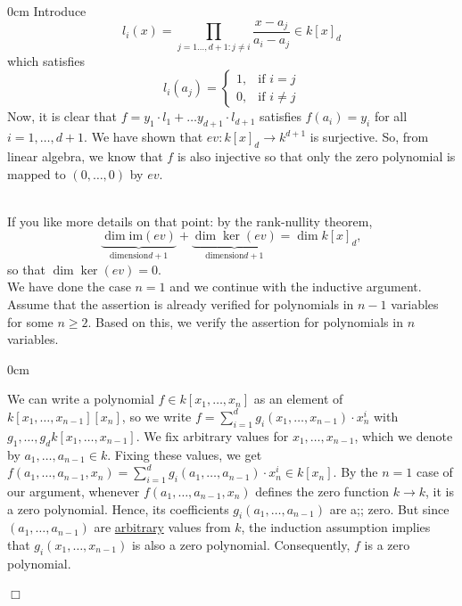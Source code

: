 \begin{theorem}[title =Theorem 1.1.8 (Continued)]
\begin{addmargin}[0.6cm]{0cm}
  Introduce \[l_i(x) = \prod_{j = 1 \ldots, d+ 1: j \neq i} \frac{x - a_j}{a_i - a_j} \in k[x]_{d}\] which satisfies 
  \[l_i(a_j) = \begin{cases}
    1, & \text{if } i = j \\ 
    0, & \text{if } i \neq j
  \end{cases}\]
  Now, it is clear that $f = y_1 \cdot l_1 + \ldots y_{d+1} \cdot l_{d+1}$ satisfies $f(a_i) = y_i$ for all $i = 1, \ldots, d+1$. 
  We have shown that $ev: k[x]_d \to k^{d+1}$ is surjective. So, from linear algebra, we know that $f$ is also injective so that only the zero polynomial 
  is mapped to $(0, \ldots, 0)$ by $ev$. 
\end{addmargin} \ \\
If you like more details on that point:  by the rank-nullity theorem, \[\underbrace{\dim \text{im}(ev)}_{\text{dimension} d+1}  + \underbrace{\dim \ker(ev)}_{\text{dimension} d+1} = \dim k[x]_d,\] so that $\dim \ker(ev) = 0$. \\

  We have done the case $n =1$ and we continue with the inductive argument. Assume that the assertion is already verified for polynomials in $n -1$ variables for some $n \geq 2$. 
  Based on this, we verify the assertion for polynomials in $n$ variables. \\
    \begin{addmargin}[0.6cm]{0cm}  

  We can write a polynomial $f \in k[x_1, \dots, x_n]$ as an element of $k[x_1, \dots, x_{n-1}][x_n]$, so we write $f= \sum_{i = 1}^{d} g_i(x_1, \dots, x_{n-1}) \cdot x_n^i$ with $g_1, \ldots, g_d  k[x_1, \dots, x_{n-1}]$. 
  We fix arbitrary values for $x_1, \ldots, x_{n-1}$, which we denote by $a_1, \ldots, a_{n-1} \in k$. Fixing these values, we get $f(a_1, \ldots, a_{n-1}, x_n) = \sum_{i=1}^{d}g_i(a_1, \ldots, a_{n-1}) \cdot x_n^i \in k[x_n]$. 
  By the $n=1$ case of our argument, whenever $f(a_1, \ldots, a_{n-1}, x_n)$ defines the zero function $k \to k$, it is a zero polynomial. 
  Hence, its coefficients $g_i(a_1, \ldots, a_{n-1})$ are a;; zero. But since $(a_1, \ldots, a_{n-1})$ are \underline{arbitrary} values from $k$, the induction assumption implies that $g_i(x_1, \ldots, x_{n-1})$
  is also a zero polynomial. Consequently, $f$ is a zero polynomial.   
    \end{addmargin}
  \begin{flushright}
    $\Box $
  \end{flushright}
\end{theorem} 

